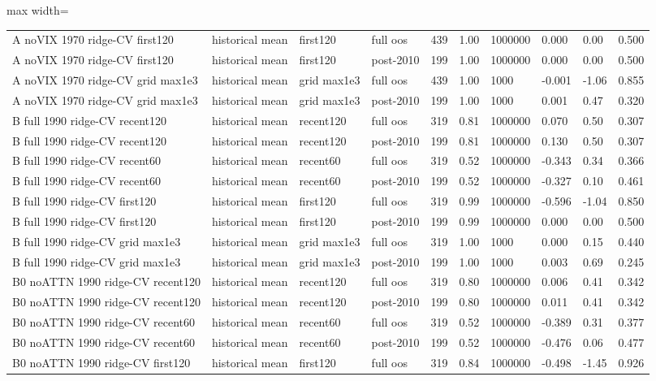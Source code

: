 \begin{table}[H]
\begin{adjustbox}{max width=\linewidth}
\begin{tabular}{llllrlllll}
A noVIX 1970 ridge-CV first120 & historical mean & first120 & full oos & 439 & 1.00 & 1000000 & 0.000 & 0.00 & 0.500 \\
A noVIX 1970 ridge-CV first120 & historical mean & first120 & post-2010 & 199 & 1.00 & 1000000 & 0.000 & 0.00 & 0.500 \\
A noVIX 1970 ridge-CV grid max1e3 & historical mean & grid max1e3 & full oos & 439 & 1.00 & 1000 & -0.001 & -1.06 & 0.855 \\
A noVIX 1970 ridge-CV grid max1e3 & historical mean & grid max1e3 & post-2010 & 199 & 1.00 & 1000 & 0.001 & 0.47 & 0.320 \\
B full 1990 ridge-CV recent120 & historical mean & recent120 & full oos & 319 & 0.81 & 1000000 & 0.070 & 0.50 & 0.307 \\
B full 1990 ridge-CV recent120 & historical mean & recent120 & post-2010 & 199 & 0.81 & 1000000 & 0.130 & 0.50 & 0.307 \\
B full 1990 ridge-CV recent60 & historical mean & recent60 & full oos & 319 & 0.52 & 1000000 & -0.343 & 0.34 & 0.366 \\
B full 1990 ridge-CV recent60 & historical mean & recent60 & post-2010 & 199 & 0.52 & 1000000 & -0.327 & 0.10 & 0.461 \\
B full 1990 ridge-CV first120 & historical mean & first120 & full oos & 319 & 0.99 & 1000000 & -0.596 & -1.04 & 0.850 \\
B full 1990 ridge-CV first120 & historical mean & first120 & post-2010 & 199 & 0.99 & 1000000 & 0.000 & 0.00 & 0.500 \\
B full 1990 ridge-CV grid max1e3 & historical mean & grid max1e3 & full oos & 319 & 1.00 & 1000 & 0.000 & 0.15 & 0.440 \\
B full 1990 ridge-CV grid max1e3 & historical mean & grid max1e3 & post-2010 & 199 & 1.00 & 1000 & 0.003 & 0.69 & 0.245 \\
B0 noATTN 1990 ridge-CV recent120 & historical mean & recent120 & full oos & 319 & 0.80 & 1000000 & 0.006 & 0.41 & 0.342 \\
B0 noATTN 1990 ridge-CV recent120 & historical mean & recent120 & post-2010 & 199 & 0.80 & 1000000 & 0.011 & 0.41 & 0.342 \\
B0 noATTN 1990 ridge-CV recent60 & historical mean & recent60 & full oos & 319 & 0.52 & 1000000 & -0.389 & 0.31 & 0.377 \\
B0 noATTN 1990 ridge-CV recent60 & historical mean & recent60 & post-2010 & 199 & 0.52 & 1000000 & -0.476 & 0.06 & 0.477 \\
B0 noATTN 1990 ridge-CV first120 & historical mean & first120 & full oos & 319 & 0.84 & 1000000 & -0.498 & -1.45 & 0.926 \\

\end{tabular}
\end{adjustbox}
\end{table}
